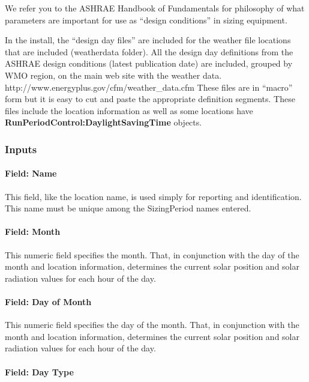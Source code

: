 We refer you to the ASHRAE Handbook of Fundamentals for philosophy of what parameters are important for use as ``design conditions'' in sizing equipment.

In the install, the ``design day files'' are included for the weather file locations that are included (weatherdata folder). All the design day definitions from the ASHRAE design conditions (latest publication date) are included, grouped by WMO region, on the main web site with the weather data. http://www.energyplus.gov/cfm/weather\_data.cfm These files are in ``macro'' form but it is easy to cut and paste the appropriate definition segments. These files include the location information as well as some locations have \textbf{RunPeriodControl:DaylightSavingTime} objects.

\subsubsection{Inputs}\label{inputs-1-024}

\paragraph{Field: Name}\label{field-name-1-023}

This field, like the location name, is used simply for reporting and identification. This name must be unique among the SizingPeriod names entered.

\paragraph{Field: Month}\label{field-month}

This numeric field specifies the month. That, in conjunction with the day of the month and location information, determines the current solar position and solar radiation values for each hour of the day.

\paragraph{Field: Day of Month}\label{field-day-of-month}

This numeric field specifies the day of the month. That, in conjunction with the month and location information, determines the current solar position and solar radiation values for each hour of the day.

\paragraph{Field: Day Type}\label{field-day-type}

